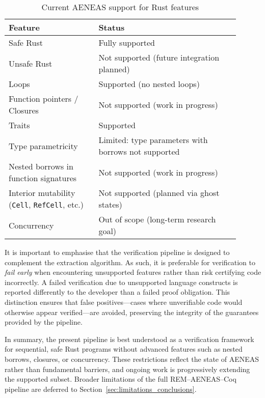 \begin{table}[h]
    \centering
    \caption{Current AENEAS support for Rust features}
    \label{tab:aeneas_limitations}
    \begin{tabular}{p{0.35\linewidth}p{0.55\linewidth}}
        \toprule
        \textbf{Feature} & \textbf{Status} \\
        \midrule
        Safe Rust & Fully supported \\
        Unsafe Rust & Not supported (future integration planned) \\
        Loops & Supported (no nested loops) \\
        Function pointers / Closures & Not supported (work in progress) \\
        Traits & Supported \\
        Type parametricity & Limited: type parameters with borrows not supported \\
        Nested borrows in function signatures & Not supported (work in progress) \\
        Interior mutability (\texttt{Cell}, \texttt{RefCell}, etc.) & Not supported (planned via ghost states) \\
        Concurrency & Out of scope (long-term research goal) \\
        \bottomrule
    \end{tabular}
\end{table}

It is important to emphasise that the verification pipeline is designed to
complement the extraction algorithm. As such, it is preferable for verification
to \textit{fail early} when encountering unsupported features rather than risk
certifying code incorrectly. A failed verification due to unsupported language
constructs is reported differently to the developer than a failed proof
obligation. This distinction ensures that false positives—cases where
unverifiable code would otherwise appear verified—are avoided, preserving the
integrity of the guarantees provided by the pipeline.

In summary, the present pipeline is best understood as a verification framework
for sequential, safe Rust programs without advanced features such as nested
borrows, closures, or concurrency. These restrictions reflect the state of
AENEAS rather than fundamental barriers, and ongoing work is progressively
extending the supported subset. Broader limitations of the full REM--AENEAS--Coq
pipeline are deferred to Section~\ref{sec:limitations_conclusions}.